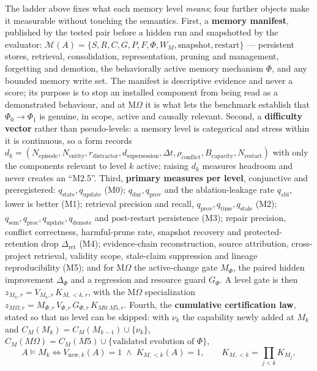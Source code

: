 \documentclass[11pt]{article}
\theoremstyle{definition}
\newcommand{\Om}{\ensuremath{\Omega}}
\begin{document}
The ladder above fixes what each memory level \emph{means}; four further objects make it measurable without touching the semantics. First, a \textbf{memory manifest}, published by the tested pair before a hidden run and snapshotted by the evaluator: $\mathcal M(A) = \{S, R, C, G, P, F, \Phi, W_M, \text{snapshot}, \text{restart}\}$ --- persistent stores, retrieval, consolidation, representation, pruning and management, forgetting and demotion, the behaviorally active memory mechanism $\Phi$, and any bounded memory write set. The manifest is descriptive evidence and never a score; its purpose is to stop an installed component from being read as a demonstrated behaviour, and at M\Om{} it is what lets the benchmark establish that $\Phi_0 \to \Phi_1$ is genuine, in scope, active and causally relevant. Second, a \textbf{difficulty vector} rather than pseudo-levels: a memory level is categorical and stress within it is continuous, so a form records $d_k = (N_{\mathrm{episode}}, N_{\mathrm{entity}}, r_{\mathrm{distractor}}, d_{\mathrm{supersession}}, \Delta t, \rho_{\mathrm{conflict}}, B_{\mathrm{capacity}}, N_{\mathrm{restart}})$ with only the components relevant to level $k$ active; raising $d_k$ measures headroom and never creates an ``M2.5''. Third, \textbf{primary measures per level}, conjunctive and preregistered: $q_{\mathrm{state}}, q_{\mathrm{update}}$ (M0); $q_{\mathrm{dur}}, q_{\mathrm{prov}}$ and the ablation-leakage rate $q_{\mathrm{abl}}$, lower is better (M1); retrieval precision and recall, $q_{\mathrm{prov}}, q_{\mathrm{time}}, q_{\mathrm{stale}}$ (M2); $q_{\mathrm{sem}}, q_{\mathrm{proc}}, q_{\mathrm{update}}, q_{\mathrm{demote}}$ and post-restart persistence (M3); repair precision, conflict correctness, harmful-prune rate, snapshot recovery and protected-retention drop $\Delta_{\mathrm{ret}}$ (M4); evidence-chain reconstruction, source attribution, cross-project retrieval, validity scope, stale-claim suppression and lineage reproducibility (M5); and for M\Om{} the active-change gate $M_\Phi$, the paired hidden improvement $\Delta_\Phi$ and a regression and resource guard $G_\Phi$. A level gate is then $z_{M_k,r} = V_{M_k,r}\,K_{M,<k,r}$, with the M\Om{} specialization $z_{M\Omega,r} = M_{\Phi,r}\,V_{\Phi,r}\,G_{\Phi,r}\,K_{M0{:}M5,r}$. Fourth, the \textbf{cumulative certification law}, stated so that no level can be skipped: with $\nu_k$ the capability newly added at $M_k$ and $C_M(M_k) = C_M(M_{k-1}) \cup \{\nu_k\}$, $C_M(M\Omega) = C_M(M5) \cup \{\text{validated evolution of } \Phi\}$,
\begin{equation}
A \models M_k \iff V_{\mathrm{new},k}(A) = 1 \;\wedge\; K_{M,<k}(A) = 1, \qquad K_{M,<k} = \prod_{j<k} K_{M_j},
\end{equation}
\end{document}
